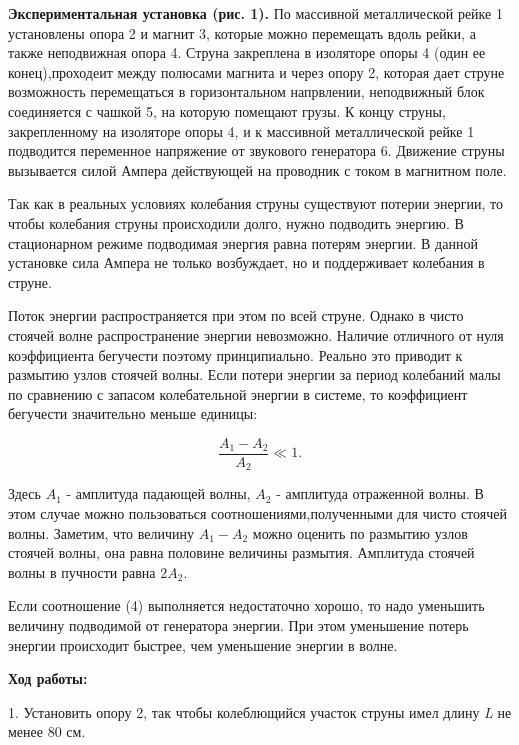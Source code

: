 \documentclass[12pt,a4paper]{article}
\begin{document}
\vspace{0.5cm}

\textbf{Экспериментальная установка (рис. 1).} По массивной металлической рейке 1 установлены опора 2 и магнит 3, которые можно перемещать вдоль рейки, а также неподвижная опора 4. Струна закреплена в изоляторе опоры 4 (один ее конец),проходеит между полюсами магнита и через опору 2, которая дает струне возможность перемещаться в горизонтальном напрвлении, неподвижный блок соединяется с чашкой 5, на которую помещают грузы. К концу струны, закрепленному на изоляторе опоры 4, и к массивной металлической рейке 1 подводится переменное напряжение от звукового генератора 6. Движение струны вызывается силой Ампера действующей на проводник с током в магнитном поле.
 
Так как в реальных условиях колебания струны существуют потерии энергии, то чтобы колебания струны происходили долго, нужно подводить энергию. В стационарном режиме подводимая энергия равна потерям энергии. В данной установке сила Ампера не только возбуждает, но и поддерживает колебания в струне.

Поток энергии распространяется при этом по всей струне. Однако в чисто стоячей волне распространение энергии невозможно. Наличие отличного от нуля коэффициента бегучести поэтому принципиально. Реально это приводит к размытию узлов стоячей волны. Если потери энергии за период колебаний малы по сравнению с запасом колебательной энергии в системе, то коэффициент бегучести значительно меньше единицы:

\begin{equation}
\frac{A_1 - A_2}{A_2} \ll 1.
\end{equation}

Здесь $A_1$ - амплитуда падающей волны, $A_2$ - амплитуда отраженной волны. В этом случае можно пользоваться соотношениями,полученными для чисто стоячей волны. Заметим, что величину $A_1 - A_2$ можно оценить по размытию узлов стоячей волны, она равна половине величины размытия. Амплитуда стоячей волны в пучности равна $2A_2$.

Если соотношение (4) выполняется недостаточно хорошо, то надо уменьшить величину подводимой от генератора энергии. При этом уменьшение потерь энергии происходит быстрее, чем уменьшение энергии в волне.

\vspace{0.5cm}

\textbf{Ход работы:}

1. Установить опору 2, так чтобы колеблющийся участок струны имел длину \textit{L} не менее 80 см.
\end{document}
